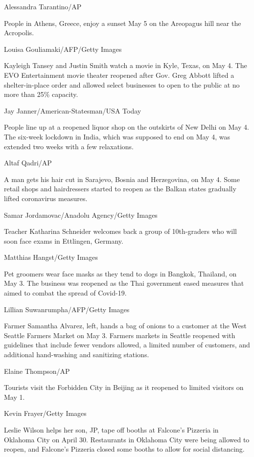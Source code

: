 Alessandra Tarantino/AP

People in Athens, Greece, enjoy a sunset May 5 on the Areopagus hill
near the Acropolis.

Louisa Gouliamaki/AFP/Getty Images

Kayleigh Tansey and Justin Smith watch a movie in Kyle, Texas, on May 4.
The EVO Entertainment movie theater reopened after Gov. Greg Abbott
lifted a shelter-in-place order and allowed select businesses to open to
the public at no more than 25\% capacity.

Jay Janner/American-Statesman/USA Today

People line up at a reopened liquor shop on the outskirts of New Delhi
on May 4. The six-week lockdown in India, which was supposed to end on
May 4, was extended two weeks with a few relaxations.

Altaf Qadri/AP

A man gets his hair cut in Sarajevo, Bosnia and Herzegovina, on May 4.
Some retail shops and hairdressers started to reopen as the Balkan
states gradually lifted coronavirus measures.

Samar Jordamovac/Anadolu Agency/Getty Images

Teacher Katharina Schneider welcomes back a group of 10th-graders who
will soon face exams in Ettlingen, Germany.

Matthias Hangst/Getty Images

Pet groomers wear face masks as they tend to dogs in Bangkok, Thailand,
on May 3. The business was reopened as the Thai government eased
measures that aimed to combat the spread of Covid-19.

Lillian Suwanrumpha/AFP/Getty Images

Farmer Samantha Alvarez, left, hands a bag of onions to a customer at
the West Seattle Farmers Market on May 3. Farmers markets in Seattle
reopened with guidelines that include fewer vendors allowed, a limited
number of customers, and additional hand-washing and sanitizing
stations.

Elaine Thompson/AP

Tourists visit the Forbidden City in Beijing as it reopened to limited
visitors on May 1.

Kevin Frayer/Getty Images

Leslie Wilson helps her son, JP, tape off booths at Falcone's Pizzeria
in Oklahoma City on April 30. Restaurants in Oklahoma City were being
allowed to reopen, and Falcone's Pizzeria closed some booths to allow
for social distancing.

